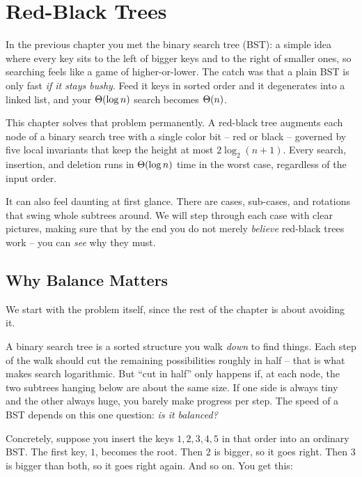 \chapter{Red-Black Trees}

In the previous chapter you met the binary search tree (BST): a simple idea
where every key sits to the left of bigger keys and to the right of
smaller ones, so searching feels like a game of higher-or-lower. The catch was
that a plain BST is only fast \emph{if it stays bushy}. Feed
it keys in sorted order and it degenerates into a linked list, and your
$\Theta(\log n)$ search becomes $\Theta(n)$.

This chapter solves that problem permanently. A red-black tree augments each
node of a binary search tree with a single color bit -- red or black -- governed
by five local invariants that keep the height at most $2\log_2(n+1)$. Every
search, insertion, and deletion runs in $\Theta(\log n)$ time in the worst case,
regardless of the input order.

It can also feel daunting at first glance. There are cases, sub-cases, and
rotations that swing whole subtrees around. We will step through each case with
clear pictures, making sure that by the end you do not merely \emph{believe}
red-black trees work -- you can \emph{see} why they must.

\section{Why Balance Matters}\label{ch13:sec-balance}

We start with the problem itself, since the rest of the chapter is about
avoiding it.

\begin{intuitionbox}
A binary search tree is a sorted structure you walk \emph{down} to find things.
Each step of the walk should cut the remaining possibilities roughly in half --
that is what makes search logarithmic. But ``cut in half'' only happens if, at
each node, the two subtrees hanging below are about the same size. If one side is
always tiny and the other always huge, you barely make progress per step. The
speed of a BST depends on this one question: \emph{is it balanced?}
\end{intuitionbox}

Concretely, suppose you insert the keys $1, 2, 3, 4, 5$ in that order into an
ordinary BST. The first key, $1$, becomes the root. Then $2$ is bigger, so it
goes right. Then $3$ is bigger than both, so it goes right again. And so on. You
get this:

